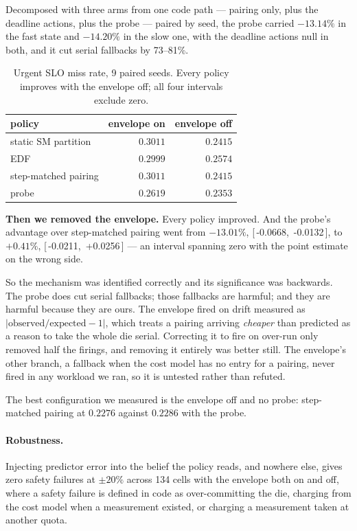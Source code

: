 \documentclass[sigconf,nonacm]{acmart}
\newcommand{\ci}[2]{[\,#1,\ #2\,]}
\begin{document}
Decomposed with three arms from one code path --- pairing only, plus the
deadline actions, plus the probe --- paired by seed, the probe carried
$-13.14\%$ in the fast state and $-14.20\%$ in the slow one, with the
deadline actions null in both, and it cut serial fallbacks by 73--81\%.

\begin{table}[t]
\centering
\begin{tabular}{lrr}
\toprule
policy & envelope on & envelope off \\
\midrule
static SM partition & $0.3011$ & $0.2415$ \\
EDF & $0.2999$ & $0.2574$ \\
step-matched pairing & $0.3011$ & $0.2415$ \\
probe & $0.2619$ & $0.2353$ \\
\bottomrule
\end{tabular}
\caption{Urgent SLO miss rate, 9 paired seeds. Every policy improves
with the envelope off; all four intervals exclude zero.}
\end{table}

\textbf{Then we removed the envelope.} Every policy improved. And the
probe's advantage over step-matched pairing went from $-13.01\%$,
\ci{-0.0668}{-0.0132}, to $+0.41\%$, \ci{-0.0211}{+0.0256} --- an
interval spanning zero with the point estimate on the wrong side.

So the mechanism was identified correctly and its significance was
backwards. The probe does cut serial fallbacks; those fallbacks are
harmful; and they are harmful because they are ours. The envelope fired
on drift measured as $|{\text{observed}/\text{expected}}-1|$, which
treats a pairing arriving \emph{cheaper} than predicted as a reason to
take the whole die serial. Correcting it to fire on over-run only removed
half the firings, and removing it entirely was better still. The
envelope's other branch, a fallback when the cost model has no entry for
a pairing, never fired in any workload we ran, so it is untested rather
than refuted.

The best configuration we measured is the envelope off and no probe:
step-matched pairing at $0.2276$ against $0.2286$ with the probe.

\paragraph{Robustness.} Injecting predictor error into the belief the
policy reads, and nowhere else, gives zero safety failures at $\pm20\%$
across 134 cells with the envelope both on and off, where a safety
failure is defined in code as over-committing the die, charging from the
cost model when a measurement existed, or charging a measurement taken at
another quota.
\end{document}
